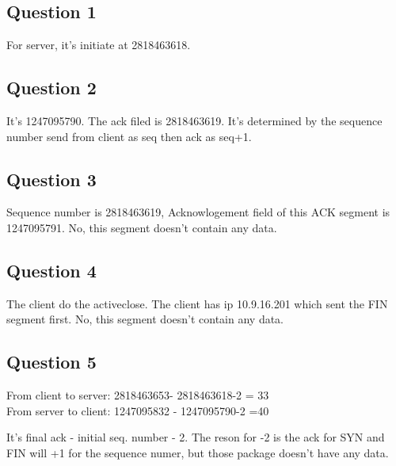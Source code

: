 \documentclass{article}
\begin{document}
\subsection{Question 1}

For server, it's initiate at 2818463618.

\subsection{Question 2}

It's 1247095790. The ack filed is 2818463619. 
It's determined by the sequence number send from client as seq then ack as seq+1.

\subsection{Question 3}

Sequence number is 2818463619, Acknowlogement field of this ACK segment is 1247095791.
No, this segment doesn't contain any data.

\subsection{Question 4}

The client do the activeclose. The client has ip 10.9.16.201 which sent the FIN segment first.
No, this segment doesn't contain any data.

\subsection{Question 5}

From client to server:
2818463653-
2818463618-2 = 33
\\
From server to client: 
1247095832 -
1247095790-2 =40

It's final ack - initial seq. number - 2. The reson for -2 is the ack for SYN and FIN will 
+1 for the sequence numer, but those package doesn't have any data.
\end{document}
